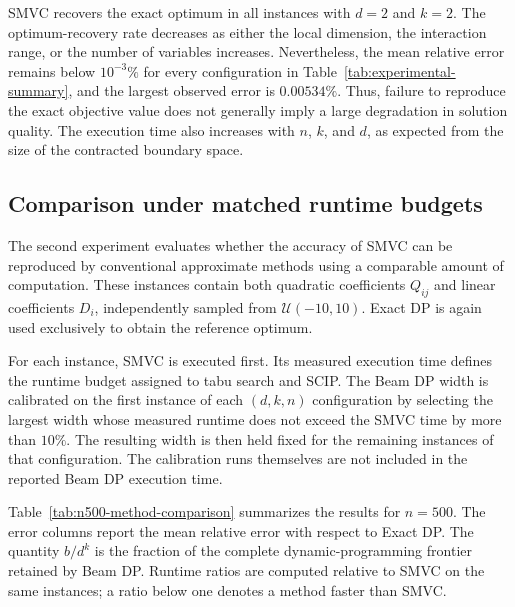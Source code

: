 \documentclass[%
 reprint,
 amsmath,amssymb,
 aps,
 pra,showkeys,
]{revtex4-2}
\begin{document}
SMVC recovers the exact optimum in all instances with $d=2$ and $k=2$.
The optimum-recovery rate decreases as either the local dimension, the
interaction range, or the number of variables increases. Nevertheless,
the mean relative error remains below $10^{-3}\%$ for every
configuration in Table~\ref{tab:experimental-summary}, and the largest
observed error is $0.00534\%$. Thus, failure to reproduce the exact
objective value does not generally imply a large degradation in
solution quality. The execution time also increases with $n$, $k$, and
$d$, as expected from the size of the contracted boundary space.

\subsection{Comparison under matched runtime budgets}
\label{ssec:matched-budget-comparison}

The second experiment evaluates whether the accuracy of SMVC can be
reproduced by conventional approximate methods using a comparable
amount of computation. These instances contain both quadratic
coefficients $Q_{ij}$ and linear coefficients $D_i$, independently
sampled from $\mathcal{U}(-10,10)$. Exact DP is again used exclusively
to obtain the reference optimum.

For each instance, SMVC is executed first. Its measured execution time
defines the runtime budget assigned to tabu search and SCIP. The Beam DP
width is calibrated on the first instance of each $(d,k,n)$
configuration by selecting the largest width whose measured runtime
does not exceed the SMVC time by more than $10\%$. The resulting width
is then held fixed for the remaining instances of that configuration.
The calibration runs themselves are not included in the reported Beam
DP execution time.

Table~\ref{tab:n500-method-comparison} summarizes the results for
$n=500$. The error columns report the mean relative error with respect
to Exact DP. The quantity $b/d^k$ is the fraction of the complete
dynamic-programming frontier retained by Beam DP. Runtime ratios are
computed relative to SMVC on the same instances; a ratio below one
denotes a method faster than SMVC.
\end{document}
